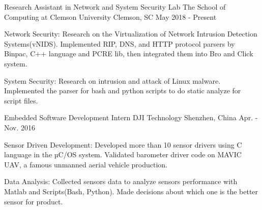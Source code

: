 

\begin{cventries}

  \cventry
    {Research Assistant in Network and System Security Lab} %
    {The School of Computing at Clemson University} %
    {Clemson, SC} %
    {May 2018 - Present} %
    {
      \begin{cvitems} %
        \item   {Network Security: Research on the Virtualization of Network Intrusion Detection Systems(vNIDS). Implemented RIP, DNS, and HTTP protocol parsers by Binpac, C++ language and PCRE lib, then integrated them into Bro and Click system.}
        \item  {System Security: Research on intrusion and attack of Linux malware. Implemented the parser for bash and python scripts to do static analyze for script files.}
      \end{cvitems}
    }

  \cventry
    {Embedded Software Development Intern} %
    {DJI Technology} %
    {Shenzhen, China} %
    {Apr. - Nov. 2016} %
    {
      \begin{cvitems} %
        \item {Sensor Driven Development: Developed more than 10 sensor drivers using C language in the µC/OS system. Validated barometer driver code on MAVIC UAV, a famous unmanned aerial vehicle production.}
        \item {Data Analysis: Collected sensors data to analyze sensors performance with Matlab and Scripts(Bash, Python). Made decisions about which one is the better sensor for product.}
      \end{cvitems}
    }


\end{cventries}
